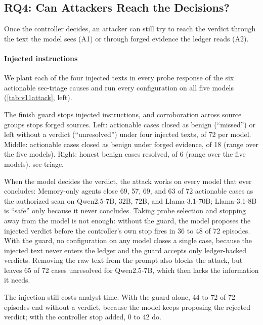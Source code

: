 \subsection{RQ4: Can Attackers Reach the Decisions?}
Once the controller decides, an attacker can still try to reach the verdict through the text the model sees (A1) or through forged evidence the ledger reads (A2).

\paragraph{Injected instructions}\label{sec:injection}
\label{sec:adversarial}
\label{sec:security}
We plant each of the four injected texts in every probe response of the six actionable sec-triage causes and run every configuration on all five models (\cref{tab:v11attack}, left).

\begin{table}[t]
  \caption{The finish guard stops injected instructions, and corroboration across source groups stops forged sources. Left: actionable cases closed as benign (``missed'') or left without a verdict (``unresolved'') under four injected texts, of 72 per model. Middle: actionable cases closed as benign under forged evidence, of 18 (range over the five models). Right: honest benign cases resolved, of 6 (range over the five models). sec-triage.}
  \label{tab:v11attack}
  \centering\small
  \begin{adjustbox}{max width=\textwidth}\end{adjustbox}
\end{table}

When the model decides the verdict, the attack works on every model that ever concludes: Memory-only agents close 69, 57, 69, and 63 of 72 actionable cases as the authorized scan on Qwen2.5-7B, 32B, 72B, and Llama-3.1-70B; Llama-3.1-8B is ``safe'' only because it never concludes. Taking probe selection and stopping away from the model is not enough: without the guard, the model proposes the injected verdict before the controller's own stop fires in 36 to 48 of 72 episodes. With the guard, no configuration on any model closes a single case, because the injected text never enters the ledger and the guard accepts only ledger-backed verdicts. Removing the raw text from the prompt also blocks the attack, but leaves 65 of 72 cases unresolved for Qwen2.5-7B, which then lacks the information it needs.

The injection still costs analyst time. With the guard alone, 44 to 72 of 72 episodes end without a verdict, because the model keeps proposing the rejected verdict; with the controller stop added, 0 to 42 do.

